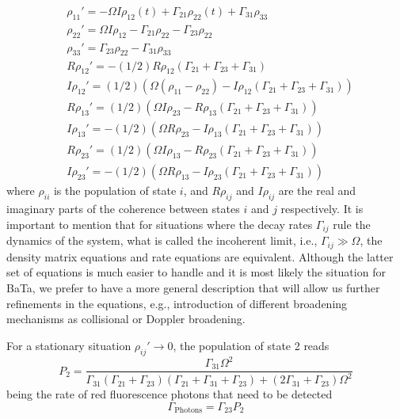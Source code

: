 \begin{align}
\label{density}
& \rho_{11}'  = -\Omega I\rho_{12}(t) +\Gamma_{21}\rho_{22}(t)+ \Gamma_{31}\rho_{33}  \\ \nonumber
& \rho_{22}'  = \Omega I\rho_{12}-\Gamma_{21}\rho_{22} - \Gamma_{23}\rho_{22}\\  \nonumber
& \rho_{33}'  = \Gamma_{23}\rho_{22}-\Gamma_{31}\rho_{33}\\  \nonumber
& R\rho_{12}'  = - (1/2) R\rho_{12} (\Gamma_{21} +\Gamma_{23} + \Gamma_{31})\\  \nonumber
& I\rho_{12}'  =(1/2)( \Omega (\rho_{11}-\rho_{22}) - I\rho_{12}(\Gamma_{21}+\Gamma_{23}+\Gamma_{31}))\\  \nonumber
& R\rho_{13}'  = (1/2)(\Omega I\rho_{23} -R\rho_{13} (\Gamma_{21}+ \Gamma_{23} + \Gamma_{31}))\\  \nonumber
& I\rho_{13}'  =-(1/ 2)(\Omega R\rho_{23} -I\rho_{13} (\Gamma_{21}+ \Gamma_{23} + \Gamma_{31}))\\  \nonumber
& R\rho_{23}'  = (1/2)( \Omega I\rho_{13} - R\rho_{23} (\Gamma_{21}+ \Gamma_{23} + \Gamma_{31}))\\  \nonumber
& I\rho_{23}'  = -(1/2)( \Omega R\rho_{13}- I\rho_{23} (\Gamma_{21}+ \Gamma_{23} + \Gamma_{31}))
\end{align}
where $\rho_{ii}$ is the population of state $i$, and $R\rho_{ij}$ and $I\rho_{ij}$ are the real and imaginary parts of the coherence between states $i$ and $j$ respectively. It is important to mention that for situations where the decay rates $\Gamma_{ij}$ rule the dynamics of the system, what is called the incoherent limit, i.e., $\Gamma_{ij}\gg\Omega$, the density matrix equations and rate equations are equivalent. Although the latter set of equations is much easier to handle and it is most likely the situation for BaTa, we prefer to have a more general description that will allow us further refinements in the equations, e.g., introduction of different broadening mechanisms as collisional or Doppler broadening. 

For a stationary situation $\rho_{ij}'\rightarrow0$, the population of state 2 reads
\begin{equation}
\label{P2}
P_2=\frac{\Gamma_{31}\Omega^2}{\Gamma_{31}(\Gamma_{21}+\Gamma_{23})(\Gamma_{21}+\Gamma_{31}+\Gamma_{23})+(2\Gamma_{31}+\Gamma_{23})\Omega^2}
\end{equation}
being the rate of red fluorescence photons that need to be detected
\begin{equation}
\label{Photons}
\Gamma_{\text{Photons}}=\Gamma_{23}P_2
\end{equation}

